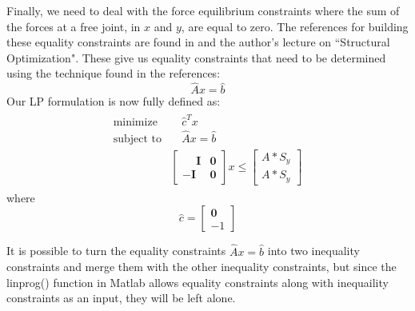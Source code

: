 \documentclass[12pt]{article}
\newcommand{\bm}[1]{\boldsymbol{#1}}
\begin{document}
Finally, we need to deal with the force equilibrium constraints where the sum of the forces at a free joint, in $x$ and $y$, are equal to zero.  The references for building these equality constraints are found in \cite{236A} and the author's lecture on ``Structural Optimization".  These give us equality constraints that need to be determined using the technique found in the references:
\begin{equation}
\hat{A}x=\hat{b}
\end{equation}
Our LP formulation is now fully defined as:
\begin{eqnarray}
\begin{array}{ll}
\mbox{minimize} &\quad \hat{c}^Tx\\
\mbox{subject to} & \quad \hat{A}x=\hat{b}\\
&\left[
\begin{array}{cc}
\phantom{-}\bm{I} & \bm{0}\\
-\bm{I} & \bm{0}
\end{array}
\right]
x \leq
\left[
\begin{array}{c}
A*S_y\\
A*S_y
\end{array}
\right]
\end{array}
\label{eqn:LP}
\end{eqnarray}
where
\begin{equation}
\hat{c} =
\left[
\begin{array}{r}
\bm{0}\\
-1
\end{array}
\right]
\end{equation}

It is possible to turn the equality constraints $\hat{A}x=\hat{b}$ into two inequality constraints and merge them with the other inequality constraints, but since the linprog() function in Matlab allows equality constraints along with inequaility constraints as an input, they will be left alone.
\end{document}
